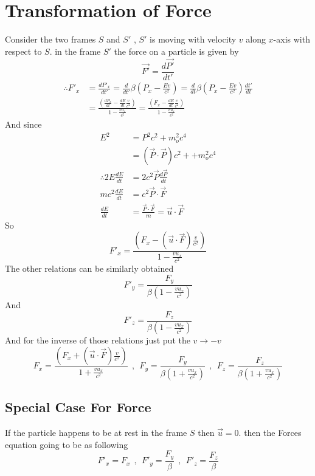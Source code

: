 \section{Transformation of Force}
Consider the two frames $S$ and $S'$ , $S'$ is moving with velocity $v$ along $x$-axis with respect to $S$.
in the frame $S'$ the force on a particle is given by 
\[
\vec{F'}  = \frac{d\vec{P'}}{dt'}
\]
\begin{align*}
    \therefore F'_x &= \frac{dP'_x}{dt'} = \frac{d}{dt'} \beta\left(P_x - \frac{Ev}{c^2}\right)
                = \frac{d}{dt} \beta\left(P_x - \frac{Ev}{c^2}\right) \frac{dt'}{dt}\\
               &=\frac{\left(\frac{dP_x}{dt} - \frac{dE}{dt}\frac{v}{c^2}\right)}{1 - \frac{vu_x}{c^2}} =\frac{\left(F_x - \frac{dE}{dt}\frac{v}{c^2}\right)}{1 - \frac{vu_x}{c^2}}            
\end{align*}
And since
\begin{align*}
    E^2 &= P^2c^2 + m_o^2 c^4 \\
        &= \left(\vec{P}\cdot\vec{P}\right) c^2 + + m_o^2 c^4\\
\therefore 2E \frac{dE}{dt} &=2 c^2 \vec{P} \frac{d\vec{P}}{dt}\\
        m c^2 \frac{dE}{dt} &=c^2 \vec{P} \cdot \vec{F}\\
        \frac{dE}{dt} &= \frac{\vec{P} \cdot \vec{F}}{m} = \vec{u} \cdot \vec{F}
\end{align*}
So 
\[
F'_x = \frac{\left(F_x - \left(\vec{u} \cdot \vec{F}\right)\frac{v}{c^2}\right)}{1 - \frac{vu_x}{c^2}}
\]
The other relations can be similarly obtained
\[
F'_y = \frac{F_y}{\beta\left(1 - \frac{vu_x}{c^2}\right)}
\]
And 
\[
F'_z = \frac{F_z}{\beta\left(1 - \frac{vu_x}{c^2}\right)}
\]
And for the inverse of those relations just put the $v \to -v$
\[
    F_x = \frac{\left(F_x + \left(\vec{u} \cdot \vec{F}\right)\frac{v}{c^2}\right)}{1 + \frac{vu_x}{c^2}}
    \ \ , \ \  
    F_y = \frac{F_y}{\beta\left(1 + \frac{vu_x}{c^2}\right)}   
    \ \ , \ \  
    F_z = \frac{F_z}{\beta\left(1 + \frac{vu_x}{c^2}\right)}
\]
\subsection{Special Case For Force}
If the particle happens to be at rest in the frame $S$ then $\vec{u} = 0$. then the Forces equation going to be as following
\[
    F'_x = F_x
    \ \ , \ \  
    F'_y = \frac{F_y}{\beta}
    \ \ , \ \  
    F'_z = \frac{F_z}{\beta}
\]

